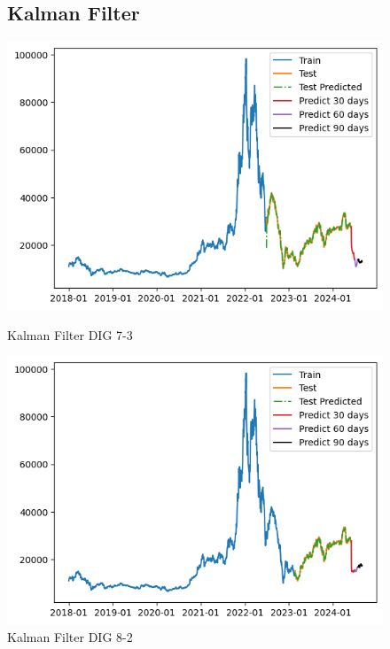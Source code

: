 \documentclass[conference]{IEEEtran}
\begin{document}
\begin{enumerate}
\begin{figure}[htbp]
\subsection{Kalman Filter}
\centering
    \begin{minipage}{0.23\textwidth}
    \centering
    \includegraphics[width=1\textwidth]{experiment/kf/DIG 7-3.png}
    \caption{Kalman Filter DIG 7-3}
    \label{fig:nvl_boxplot}
    \end{minipage}
    \hfill
    \begin{minipage}{0.23\textwidth}
    \centering
    \includegraphics[width=1\textwidth]{experiment/kf/dig 8-2.png}
    \caption{Kalman Filter DIG 8-2}
    \label{fig:nvl_histogram}
    \end{minipage}
    \begin{minipage}{0.23\textwidth}

\end{minipage}
\end{figure}
\end{enumerate}
\end{document}
